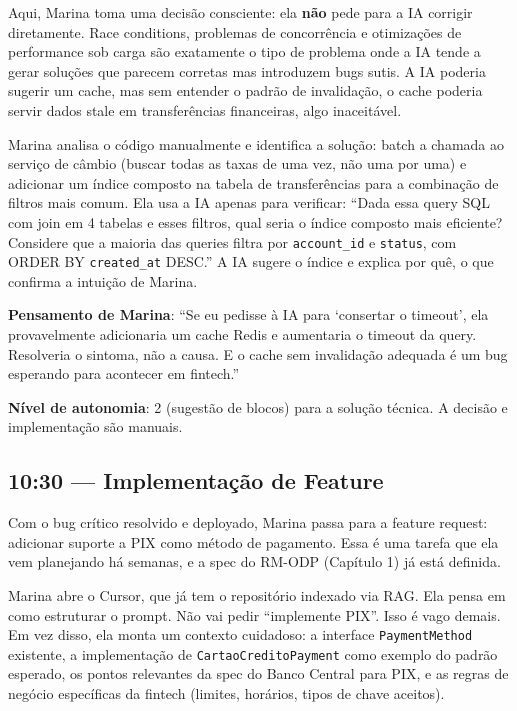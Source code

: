 Aqui, Marina toma uma decisão consciente: ela \textbf{não} pede para a IA corrigir
diretamente. Race conditions, problemas de concorrência e otimizações de performance
sob carga são exatamente o tipo de problema onde a IA tende a gerar soluções que
parecem corretas mas introduzem bugs sutis. A IA poderia sugerir um cache, mas sem
entender o padrão de invalidação, o cache poderia servir dados stale em transferências
financeiras, algo inaceitável.

Marina analisa o código manualmente e identifica a solução: batch a chamada ao serviço
de câmbio (buscar todas as taxas de uma vez, não uma por uma) e adicionar um índice
composto na tabela de transferências para a combinação de filtros mais comum. Ela usa
a IA apenas para verificar: ``Dada essa query SQL com join em 4 tabelas e esses
filtros, qual seria o índice composto mais eficiente? Considere que a maioria das
queries filtra por \texttt{account\_id} e \texttt{status}, com ORDER BY
\texttt{created\_at} DESC.'' A IA sugere o índice e explica por quê, o que confirma
a intuição de Marina.

\textbf{Pensamento de Marina}: ``Se eu pedisse à IA para `consertar o timeout', ela
provavelmente adicionaria um cache Redis e aumentaria o timeout da query. Resolveria
o sintoma, não a causa. E o cache sem invalidação adequada é um bug esperando para
acontecer em fintech.''

\textbf{Nível de autonomia}: 2 (sugestão de blocos) para a solução
técnica. A decisão e implementação são manuais.

\subsection{10:30 --- Implementação de Feature}

Com o bug crítico resolvido e deployado, Marina passa para a feature request: adicionar
suporte a PIX como método de pagamento. Essa é uma tarefa que ela vem planejando há
semanas, e a spec do RM-ODP (Capítulo 1) já está definida.

Marina abre o Cursor, que já tem o repositório indexado via RAG. Ela pensa em como
estruturar o prompt. Não vai pedir ``implemente PIX''. Isso é vago demais. Em vez
disso, ela monta um contexto cuidadoso: a interface \texttt{PaymentMethod} existente,
a implementação de \texttt{CartaoCreditoPayment} como exemplo do padrão esperado, os
pontos relevantes da spec do Banco Central para PIX, e as regras de negócio específicas
da fintech (limites, horários, tipos de chave aceitos).

